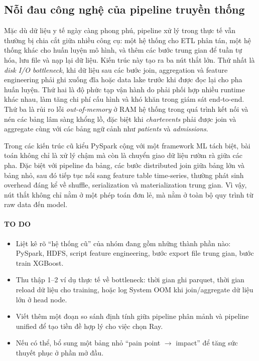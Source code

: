 \subsection{Nỗi đau công nghệ của pipeline truyền thống}
Mặc dù dữ liệu y tế ngày càng phong phú, pipeline xử lý trong thực tế vẫn thường bị chia cắt giữa nhiều công cụ: một hệ thống cho ETL phân tán, một hệ thống khác cho huấn luyện mô hình, và thêm các bước trung gian để tuần tự hóa, lưu file và nạp lại dữ liệu. Kiến trúc này tạo ra ba nút thắt lớn. Thứ nhất là \textit{disk I/O bottleneck}, khi dữ liệu sau các bước join, aggregation và feature engineering phải ghi xuống đĩa hoặc data lake trước khi được đọc lại cho pha huấn luyện. Thứ hai là độ phức tạp vận hành do phải phối hợp nhiều runtime khác nhau, làm tăng chi phí cấu hình và khó khăn trong giám sát end-to-end. Thứ ba là rủi ro lỗi \textit{out-of-memory} ở RAM hệ thống trong quá trình kết nối và nén các bảng lâm sàng khổng lồ, đặc biệt khi \textit{chartevents} phải được join và aggregate cùng với các bảng ngữ cảnh như \textit{patients} và \textit{admissions}.

Trong các kiến trúc cũ kiểu PySpark cộng với một framework ML tách biệt, bài toán không chỉ là xử lý chậm mà còn là chuyển giao dữ liệu rườm rà giữa các pha. Đặc biệt với pipeline đa bảng, các bước distributed join giữa bảng lớn và bảng nhỏ, sau đó tiếp tục nối sang feature table time-series, thường phát sinh overhead đáng kể về shuffle, serialization và materialization trung gian. Vì vậy, nút thắt không chỉ nằm ở một phép toán đơn lẻ, mà nằm ở toàn bộ quy trình từ raw data đến model.

\paragraph{TO DO}
\begin{itemize}
    \item Liệt kê rõ ``hệ thống cũ'' của nhóm đang gồm những thành phần nào: PySpark, HDFS, script feature engineering, bước export file trung gian, bước train XGBoost.
    \item Thu thập 1--2 ví dụ thực tế về bottleneck: thời gian ghi parquet, thời gian reload dữ liệu cho training, hoặc log System OOM khi join/aggregate dữ liệu lớn ở head node.
    \item Viết thêm một đoạn so sánh định tính giữa pipeline phân mảnh và pipeline unified để tạo tiền đề hợp lý cho việc chọn Ray.
    \item Nếu có thể, bổ sung một bảng nhỏ ``pain point $\rightarrow$ impact'' để tăng sức thuyết phục ở phần mở đầu.
\end{itemize}

